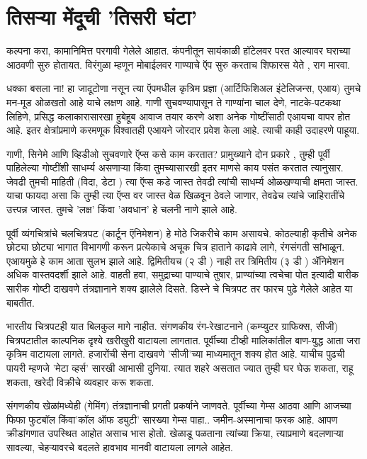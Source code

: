 \chapter{तिसऱ्या मेंदूची 'तिसरी घंटा'}

कल्पना करा, कामानिमित्त परगावी गेलेले आहात. कंपनीतून सायंकाळी हॉटेलवर परत आल्यावर घराच्या आठवणी सुरु होतायत. विरंगुळा म्हणून मोबाईलवर गाण्याचे ऍप सुरु करताच शिफारस येते , राग मारवा.

धक्का बसला ना! हा जादूटोणा नसून त्या ऍपमधील कृत्रिम प्रज्ञा (आर्टिफिशिअल इंटेलिजन्स, एआय) तुमचे मन-मूड ओळखतो आहे याचे लक्षण आहे. गाणी सुचवण्यापासून ते गाण्यांना चाल देणे, नाटके-पटकथा लिहिणे, प्रसिद्ध कलाकारासारखा हुबेहूब आवाज तयार करणे अशा अनेक गोष्टींसाठी एआयचा वापर होत आहे. इतर क्षेत्रांप्रमाणे करमणूक विश्वातही एआयने जोरदार प्रवेश केला आहे. त्याची काही उदाहरणे पाहूया.

गाणी, सिनेमे आणि व्हिडीओ सुचवणारे ऍप्स कसे काम करतात? प्रामुख्याने दोन प्रकारे , तुम्ही पूर्वी पाहिलेल्या गोष्टींशी साधर्म्य असणाऱ्या किंवा तुमच्यासारखी इतर माणसे काय पसंत करतात त्यानुसार. जेवढी तुमची माहिती (विदा, डेटा ) त्या ऍप्स कडे जास्त तेवढी त्यांची साधर्म्य ओळखण्याची क्षमता जास्त. याचा फायदा असा कि तुम्ही त्या ऍप्स वर जास्त वेळ खिळवून ठेवले जाणार, तेवढेच त्यांचे जाहिरातींचे उत्त्पन्न जास्त. तुमचे 'लक्ष' किंवा 'अवधान' हे चलनी नाणे झाले आहे.

पूर्वी व्यंगचित्रांचे चलचित्रपट (कार्टून ऍनिमेशन) हे मोठे जिकरीचे काम असायचे. कोठल्याही कृतीचे अनेक छोट्या छोट्या भागात विभागणी करून प्रत्येकाचे अचूक चित्र हाताने काढावे लागे, रंगसंगती सांभाळून. एआयमुळे हे काम आता सुलभ झाले आहे. द्विमितीयच (२ डी ) नाही तर त्रिमितीय (३ डी ) ॲनिमेशन अधिक वास्तवदर्शी झाले आहे. वाहती हवा, समुद्राच्या पाण्याचे तुषार, प्राण्यांच्या त्वचेचा पोत इत्यादी बारीक सारीक गोष्टी दाखवणे तंत्रज्ञानाने शक्य झालेले दिसते. डिस्ने चे चित्रपट तर फारच पुढे गेलेले आहेत या बाबतीत.

भारतीय चित्रपटही यात बिलकुल मागे नाहीत. संगणकीय रंग-रेखाटनाने (कम्प्युटर ग्राफिक्स, सीजी) चित्रपटातील काल्पनिक दृश्ये खरीखुरी वाटायला लागतात. पूर्वीच्या टीव्ही मालिकांतील बाण-युद्ध आता जरा कृत्रिम वाटायला लागते. हजारोंची सेना दाखवणे 'सीजी'च्या माध्यमातून शक्य होत आहे. याचीच पुढची पायरी म्हणजे 'मेटा व्हर्स' सारखी आभासी दुनिया. त्यात शहरे असतात ज्यात तुम्ही घर घेऊ शकता, राहू शकता, खरेदी विक्रीचे व्यवहार करू शकता.

संगणकीय खेळांमध्येही (गेमिंग) तंत्रज्ञानाची प्रगती प्रकर्षाने जाणवते. पूर्वीच्या गेम्स आठवा आणि आजच्या फिफा फुटबॉल किंवा'कॉल ऑफ ड्युटी' सारख्या गेम्स पाहा.. जमीन-अस्मानाचा फरक आहे. आपण क्रीडांगणात उपस्थित आहोत असाच भास होतो. खेळाडू पळताना त्यांच्या क्रिया, त्याप्रमाणे बदलणाऱ्या सावल्या, चेहऱ्यावरचे बदलते हावभाव मानवी वाटायला लागले आहेत.

